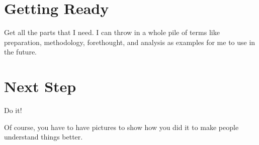\documentclass[12pt]{dalcsthesis}
\begin{document}
\section{Getting Ready}

Get all the parts that I need.  I can throw in a whole pile of terms like
preparation,
methodology,
forethought,
and
analysis
as examples for me to use in the future.

\section{Next Step}

Do it!

Of course, you have to have pictures to show how you did it to make people
understand things better.



\end{document}
